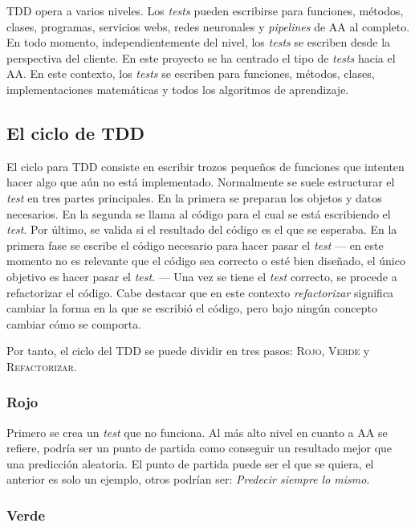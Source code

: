 \ac{TDD} opera a varios niveles. Los \emph{tests} pueden escribirse para
funciones, métodos, clases, programas, servicios webs, redes neuronales y
\emph{pipelines} de \ac{AA} al completo. En todo momento, independientemente del
nivel, los \emph{tests} se escriben desde la perspectiva del cliente. En este
proyecto se ha centrado el tipo de \emph{tests} hacia el \ac{AA}. En este
contexto, los \emph{tests} se escriben para funciones, métodos, clases,
implementaciones matemáticas y todos los algoritmos de aprendizaje.

\subsection{El ciclo de \ac{TDD}}
\label{subsec:tddcycle}

El ciclo para \ac{TDD} consiste en escribir trozos pequeños de funciones que
intenten hacer algo que aún no está implementado. Normalmente se suele
estructurar el \emph{test} en tres partes principales. En la primera se preparan
los objetos y datos necesarios. En la segunda se llama al código para el cual se
está escribiendo el \emph{test}. Por último, se valida si el resultado del
código es el que se esperaba. En la primera fase se escribe el código
necesario para hacer pasar el \emph{test} --- en este momento no es relevante
que el código sea correcto o esté bien diseñado, el único objetivo es hacer
pasar el \emph{test}. --- Una vez se tiene el \emph{test} correcto, se procede a
refactorizar el código. Cabe destacar que en este contexto \emph{refactorizar}
significa cambiar la forma en la que se escribió el código, pero bajo ningún
concepto cambiar cómo se comporta.

Por tanto, el ciclo del \ac{TDD} se puede dividir en tres pasos: \textsc{Rojo},
\textsc{Verde} y \textsc{Refactorizar}.

\subsubsection{Rojo}
\label{sec:tddred}

Primero se crea un \emph{test} que no funciona. Al más alto nivel en cuanto a
\ac{AA} se refiere, podría ser un punto de partida como conseguir un resultado
mejor que una predicción aleatoria. El punto de partida puede ser el que se
quiera, el anterior es solo un ejemplo, otros podrían ser: \emph{Predecir
  siempre lo mismo}.

\subsubsection{Verde}
\label{sec:tddgreen}

